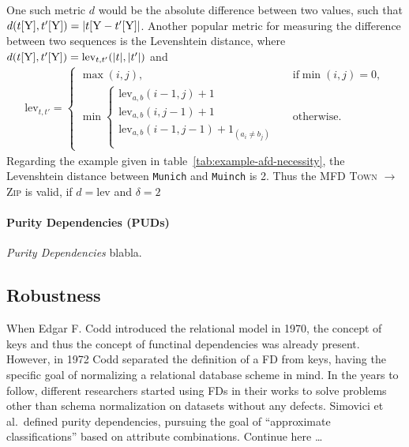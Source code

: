 One such metric \( d \) would be the absolute difference between two values, such that \( d(t[\textsc{Y}], t'[\textsc{Y}]) = | t[\textsc{Y} - t'[\textsc{Y}]| \).
Another popular metric for measuring the difference between two sequences is the Levenshtein distance, where \( d(t[\textsc{Y}], t'[\textsc{Y}]) = \text{lev}_{t,t'}(|t|, |t'|) \) and
\begin{align}
    \text{lev}_{t,t'} =
    \begin{cases}
        \max(i,j),  & \text{if} \min(i,j)=0, \\
        \min \begin{cases}
            \text{lev}_{a, b}(i-1, j)+1 & \\
            \text{lev}_{a, b}(i, j-1)+1 & \\
            \text{lev}_{a, b}(i-1, j-1)+1_{(a_i \neq b_j)} \\
        \end{cases} & \text{otherwise.}
    \end{cases}
\end{align}
Regarding the example given in table~\ref{tab:example-afd-necessity}, the Levenshtein distance between \texttt{Munich} and \texttt{Muinch} is 2.
Thus the MFD \textsc{Town} \( \to\) \textsc{Zip} is valid, if \( d = \text{lev} \) and \( \delta = 2 \)

\paragraph{Purity Dependencies (PUDs)}
\emph{Purity Dependencies} blabla.

\subsection{Robustness}
When Edgar F. Codd introduced the relational model in 1970, the concept of keys and thus the concept of functinal dependencies was already present.\cite[p.~70]{MAI83}
However, in 1972 Codd separated the definition of a FD from keys, having the specific goal of normalizing a relational database scheme in mind.
In the years to follow, different researchers started using FDs in their works to solve problems other than schema normalization on datasets without any defects.
Simovici et al.\ defined purity dependencies, pursuing the goal of ``approximate classifications'' based on attribute combinations.\cite[p.~307]{SIM02}
Continue here \dots

\newpage
